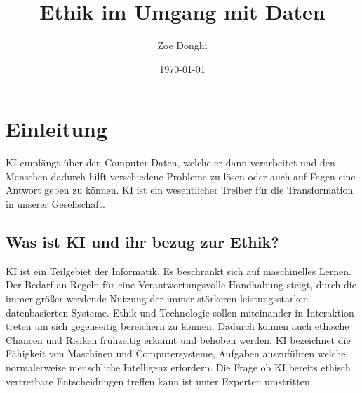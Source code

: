 \documentclass{report}
\title{Ethik im Umgang mit Daten}
\author{Zoe Donghi}
\date{\today}
\begin{document}
\maketitle



\tableofcontents

\chapter{Einleitung}

KI empfängt über den Computer Daten, welche er dann verarbeitet und den Menschen dadurch hilft verschiedene Probleme zu lösen oder auch auf Fagen eine Antwort geben zu können.
KI ist ein wesentlicher Treiber für die Transformation in unserer Gesellschaft.

\section{Was ist KI und ihr bezug zur Ethik?}
KI ist ein Teilgebiet der Informatik. Es beschränkt sich auf maschinelles Lernen.
Der Bedarf an Regeln für eine Verantwortungsvolle Handhabung steigt, durch die immer größer werdende Nutzung der immer stärkeren leistungsstarken datenbasierten Systeme. 
Ethik und Technologie sollen miteinander in Interaktion treten um sich gegenseitig bereichern zu können. Dadurch können auch ethische Chancen und Risiken frühzeitig erkannt und behoben werden. 
KI bezeichnet die Fähigkeit von Maschinen und Computersysteme, Aufgaben auszuführen welche normalerweise menschliche Intelligenz erfordern. 
Die Frage ob KI bereits ethisch vertretbare Entscheidungen treffen kann ist unter Experten umstritten. 
\end{document}
